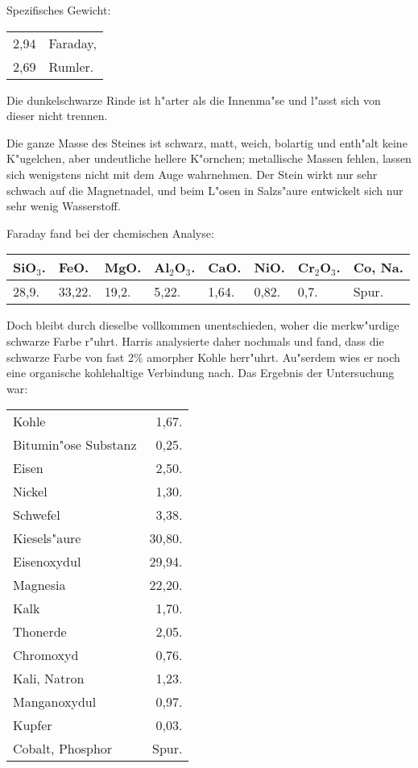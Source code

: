 \documentclass[a4paper, 11pt, oneside]{article}
\begin{document}
Spezifisches Gewicht:  
\begin{table}[!ht]
    \centering\swabfamily\Large
    \begin{tabular}{l l}
        2,94 & Faraday,\\
        2,69 & Rumler.
    \end{tabular}
\end{table}

Die dunkelschwarze Rinde ist h"arter als die Innenma"se und l"asst sich von dieser nicht trennen.

Die ganze Masse des Steines ist schwarz, matt, weich, bolartig und enth"alt keine K"ugelchen, aber undeutliche hellere K"ornchen; metallische Massen fehlen, lassen sich wenigstens nicht mit dem Auge wahrnehmen. Der Stein wirkt nur sehr schwach auf die Magnetnadel, und beim L"osen in Salzs"aure entwickelt sich nur sehr wenig Wasserstoff.

Faraday fand bei der chemischen Analyse:
\begin{table}[H]
    \centering\swabfamily\Large
    \begin{tabular}{l l l l l l l l}
        SiO$_{3}$. & FeO. & MgO. & Al$_{2}$O$_{3}$. & CaO. & NiO. & Cr$_{2}$O$_{3}$. & Co, Na. \\ \hline
        28,9. & 33,22. & 19,2. & 5,22. & 1,64. & 0,82. & 0,7. & Spur. \\
    \end{tabular}
\end{table}

Doch bleibt durch dieselbe vollkommen unentschieden, woher die merkw"urdige schwarze Farbe r"uhrt. Harris analysierte daher nochmals und fand, dass die schwarze Farbe von fast 2\% amorpher Kohle herr"uhrt. Au"serdem wies er noch eine organische kohlehaltige Verbindung nach. Das Ergebnis der Untersuchung war:
\begin{table}[!ht]
    \centering\swabfamily\Large
    \begin{tabular}{l r}
        Kohle & 1,67. \\
        Bitumin"ose Substanz & 0,25. \\
        Eisen & 2,50. \\
        Nickel & 1,30. \\
        Schwefel & 3,38. \\
        Kiesels"aure & 30,80. \\
        Eisenoxydul & 29,94. \\
        Magnesia & 22,20. \\
        Kalk & 1,70. \\
        Thonerde & 2,05. \\
        Chromoxyd & 0,76. \\
        Kali, Natron & 1,23. \\
        Manganoxydul & 0,97. \\
        Kupfer & 0,03. \\
        Cobalt, Phosphor & Spur. \\
    \end{tabular}
\end{table}
\end{document}
